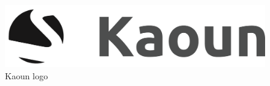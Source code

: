 \begin{spacing}{1.2}
\begin{figure}[!ht]\centering
\includegraphics[scale=0.3]{kaounlogo.png}
\caption{Kaoun logo}
\label{fig:fig1}
\end{figure}



\end{spacing}
